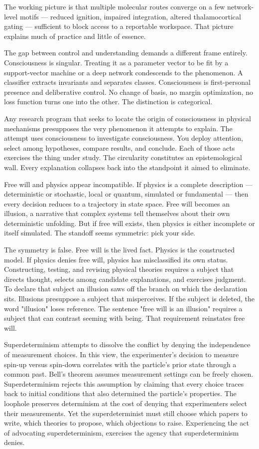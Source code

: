 The working picture is that multiple molecular routes converge on a few network-level motifs — reduced ignition, impaired integration, altered thalamocortical gating — sufficient to block access to a reportable workspace. That picture explains much of practice and little of essence.

The gap between control and understanding demands a different frame entirely. Consciousness is singular. Treating it as a parameter vector to be fit by a support-vector machine or a deep network condescends to the phenomenon. A classifier extracts invariants and separates classes. Consciousness is first-personal presence and deliberative control. No change of basis, no margin optimization, no loss function turns one into the other. The distinction is categorical.

Any research program that seeks to locate the origin of consciousness in physical mechanisms presupposes the very phenomenon it attempts to explain. The attempt uses consciousness to investigate consciousness. You deploy attention, select among hypotheses, compare results, and conclude. Each of those acts exercises the thing under study. The circularity constitutes an epistemological wall. Every explanation collapses back into the standpoint it aimed to eliminate.

Free will and physics appear incompatible. If physics is a complete description — deterministic or stochastic, local or quantum, simulated or fundamental — then every decision reduces to a trajectory in state space. Free will becomes an illusion, a narrative that complex systems tell themselves about their own deterministic unfolding. But if free will exists, then physics is either incomplete or itself simulated. The standoff seems symmetric: pick your side.

The symmetry is false. Free will is the lived fact. Physics is the constructed model. If physics denies free will, physics has misclassified its own status. Constructing, testing, and revising physical theories requires a subject that directs thought, selects among candidate explanations, and exercises judgment. To declare that subject an illusion saws off the branch on which the declaration sits. Illusions presuppose a subject that misperceives. If the subject is deleted, the word "illusion" loses reference. The sentence "free will is an illusion" requires a subject that can contrast seeming with being. That requirement reinstates free will.

Superdeterminism attempts to dissolve the conflict by denying the independence of measurement choices. In this view, the experimenter's decision to measure spin-up versus spin-down correlates with the particle's prior state through a common past. Bell's theorem assumes measurement settings can be freely chosen. Superdeterminism rejects this assumption by claiming that every choice traces back to initial conditions that also determined the particle's properties. The loophole preserves determinism at the cost of denying that experimenters select their measurements. Yet the superdeterminist must still choose which papers to write, which theories to propose, which objections to raise. Experiencing the act of advocating superdeterminism, exercises the agency that superdeterminism denies.

